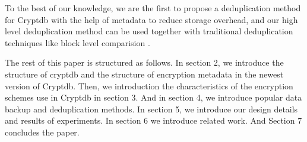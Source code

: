 

To the best of our knowledge, we are the first to propose a deduplication method for Cryptdb with the help of metadata to reduce storage overhead, and our high level deduplication method can be used together with traditional deduplication techniques like block level comparision \citep{bellare2013message}.

The rest of this paper is structured as follows. In section 2, we introduce the structure of cryptdb and the structure of encryption metadata in the newest version of Cryptdb. Then, we introduction the characteristics of the encryption schemes use in Cryptdb in section 3. And in section 4, we introduce popular data backup and deduplication methods. In section 5, we introduce our design details and results of experiments. In section 6 we introduce related work. And Section 7 concludes the paper.


